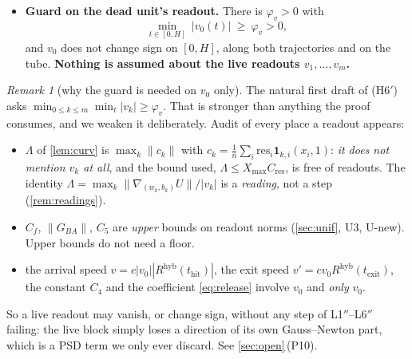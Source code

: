\documentclass[11pt]{article}
\theoremstyle{remark}
\newtheorem{remark}[theorem]{Remark}
\newcommand{\thit}{t_{\mathrm{hit}}}
\newcommand{\texit}{t_{\mathrm{exit}}}
\newcommand{\hyb}{\mathrm{hyb}}
\newcommand{\res}{\mathrm{res}}
\newcommand{\Cres}{C_{\mathrm{res}}}
\newcommand{\Xmax}{X_{\max}}
\newcommand{\hyplabel}[1]{\textup{(#1)}}
\begin{document}
\begin{itemize}
\item[\hyplabel{H6$'$}] \textbf{Guard on the dead unit's readout.} There is
$\varphi_v>0$ with
\[
\min_{t\in[0,H]}\ \bigl|v_0(t)\bigr|\ \ge\ \varphi_v>0,
\]
and $v_0$ does not change sign on $[0,H]$, along both trajectories and on the
tube. \textbf{Nothing is assumed about the live readouts $v_1,\dots,v_m$.}
\end{itemize}

\begin{remark}[why the guard is needed on $v_0$ only]\label{rem:H6only0}
The natural first draft of \hyplabel{H6$'$} asks $\min_{0\le k\le
m}\min_t|v_k|\ge\varphi_v$. That is stronger than anything the proof consumes,
and we weaken it deliberately. Audit of every place a readout appears:
\begin{itemize}
\item $\Lambda$ of \cref{lem:curv} is $\max_k\|c_k\|$ with
$c_k=\frac1n\sum_i\res_i\mathbf1_{k,i}(x_i,1)$: \emph{it does not mention $v_k$
at all}, and the bound used, $\Lambda\le\Xmax\Cres$, is free of readouts. The
identity $\Lambda=\max_k\|\nabla_{(w_k,b_k)}U\|/|v_k|$ is a \emph{reading}, not
a step (\cref{rem:readings}).
\item $C_f$, $\|G_{BA}\|$, $C_5$ are \emph{upper} bounds on readout norms
(\cref{sec:unif}, U3, U-new). Upper bounds do not need a floor.
\item the arrival speed $v=c|v_0||R^{\hyb}(\thit)|$, the exit speed
$v'=cv_0R^{\hyb}(\texit)$, the constant $C_4$ and the coefficient
\eqref{eq:release} involve $v_0$ and \emph{only} $v_0$.
\end{itemize}
So a live readout may vanish, or change sign, without any step of
L1$''$--L6$''$ failing: the live block simply loses a direction of its own
Gauss--Newton part, which is a PSD term we only ever discard. See
\cref{sec:open}\,(P10).
\end{remark}
\end{document}
